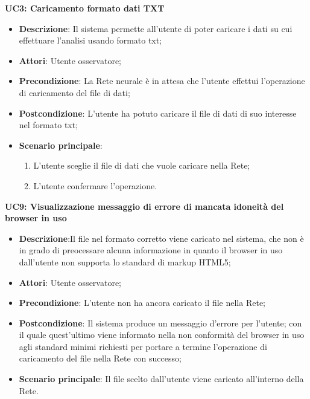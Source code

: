 \textbf{UC3: Caricamento formato dati TXT}\mbox{}
\label{UC3: Caricamento formato dati TXT}
\begin{itemize}
\item \textbf{Descrizione}: Il sistema permette all'utente di poter caricare i dati su cui effettuare l'analisi usando formato txt;
\item \textbf{Attori}: Utente osservatore;
\item \textbf{Precondizione}: La Rete neurale \`e in attesa che l'utente effettui l'operazione di caricamento del file di dati;
\item \textbf{Postcondizione}: L'utente ha potuto caricare il file di dati di suo interesse nel formato txt;
\item \textbf{Scenario principale}:
\begin{enumerate}
\item L'utente sceglie il file di dati che vuole caricare nella Rete;
\item L'utente confermare l'operazione.
\end{enumerate}
\end{itemize}


\textbf{UC9: Visualizzazione messaggio di errore di mancata idoneità del browser in uso}\mbox{}
\label{UC9: Visualizzazione messaggio di errore di mancata idoneita del browser in uso}
\begin{itemize}
\item \textbf{Descrizione}:Il file nel formato corretto viene caricato nel sistema, che non \`e in grado di preocessare alcuna informazione in quanto il browser in uso dall'utente non supporta lo standard di markup HTML5;
\item \textbf{Attori}: Utente osservatore;
\item \textbf{Precondizione}: L'utente non ha ancora caricato il file nella Rete;
\item \textbf{Postcondizione}: Il sistema produce un messaggio d'errore per l'utente; con il quale quest'ultimo viene informato nella non conformit\`a del browser in uso agli standard minimi richiesti per portare a termine l'operazione di caricamento del file nella Rete con successo;
\item \textbf{Scenario principale}: Il file scelto dall'utente viene caricato all'interno della Rete.
\end{itemize}


